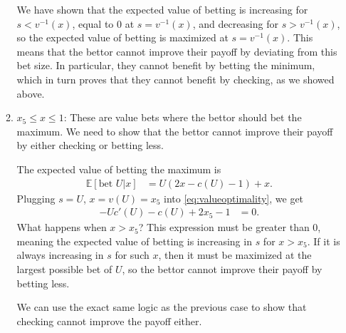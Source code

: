 \documentclass[../../main/main.tex]{subfiles}
\begin{document}
\begin{customproof}
\begin{enumerate}
\begin{enumerate}
                    We have shown that the expected value of betting is increasing for $s < v^{-1}(x)$, equal to $0$ at $s = v^{-1}(x)$, and decreasing for $s > v^{-1}(x)$, so the expected value of betting is maximized at $s = v^{-1}(x)$. This means that the bettor cannot improve their payoff by deviating from this bet size. In particular, they cannot benefit by betting the minimum, which in turn proves that they cannot benefit by checking, as we showed above.
                \item $x_5 \leq x \leq 1$:
                    These are value bets where the bettor should bet the maximum. We need to show that the bettor cannot improve their payoff by either checking or betting less.

                    The expected value of betting the maximum is
                    \begin{align*}
                        \mathbb{E}[\text{bet } U | x] & = U(2x - c(U) - 1) + x. 
                    \end{align*}
                    Plugging $s=U$, $x=v(U)=x_5$ into \ref{eq:valueoptimality}, we get
                    \begin{align*}
                        -U c'(U) - c(U) + 2x_5 - 1 &= 0.
                    \end{align*}
                    What happens when $x > x_5$? This expression must be greater than $0$, meaning the expected value of betting is increasing in $s$ for $x > x_5$. If it is always increasing in $s$ for such $x$, then it must be maximized at the largest possible bet of $U$, so the bettor cannot improve their payoff by betting less.

                    We can use the exact same logic as the previous case to show that checking cannot improve the payoff either.
                    
            \end{enumerate}
    \end{enumerate}
\end{customproof}
\end{document}
